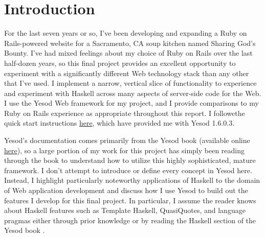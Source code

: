 \section{Introduction}

For the last seven years or so, I've been developing and expanding a Ruby on Rails-powered website for a Sacramento, CA soup kitchen named Sharing God's Bounty. I've had mixed feelings about my choice of Ruby on Rails over the last half-dozen years, so this final project provides an excellent opportunity to experiment with a significantly different Web technology stack than any other that I've used. I implement a narrow, vertical slice of functionality to experience and experiment with Haskell across many aspects of server-side code for the Web. I use the Yesod Web framework for my project, and I provide comparisons to my Ruby on Rails experience as appropriate throughout this report. I followethe quick start instructions \href{https://www.yesodweb.com/page/quickstart}{here}, which have provided me with Yesod 1.6.0.3.

Yesod's documentation comes primarily from the Yesod book \cite{ybk} (available online \href{https://www.yesodweb.com/book}{here}), so a large portion of my work for this project has simply been reading through the book to understand how to utilize this highly sophisticated, mature framework. I don't attempt to introduce or define every concept in Yesod here. Instead, I highlight particularly noteworthy applications of Haskell to the domain of Web application development and discuss how I use Yesod to build out the features I develop for this final project. In particular, I assume the reader knows about Haskell features such as Template Haskell, QuasiQuotes, and language pragmas either through prior knowledge or by reading the Haskell section of the Yesod book \cite{ybkHaskell}.

